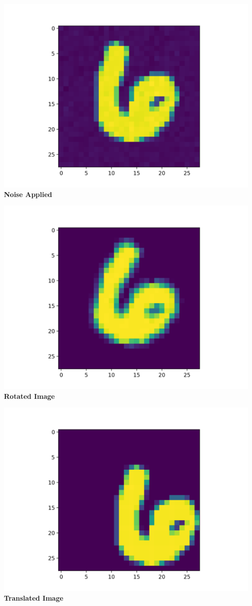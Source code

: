 \documentclass[12pt, letterpaper, notitlepage, twoside]{article}
\theoremstyle{definition}
\theoremstyle{plain}
\begin{document}
\begin{center}
    \includegraphics{Imgs/6_noise.png}
    \textbf{Noise Applied}

    \includegraphics{Imgs/6_rot.png}
    \textbf{Rotated Image}

    \includegraphics{Imgs/6_trans.png}
    \textbf{Translated Image}
\end{center}
\end{document}

